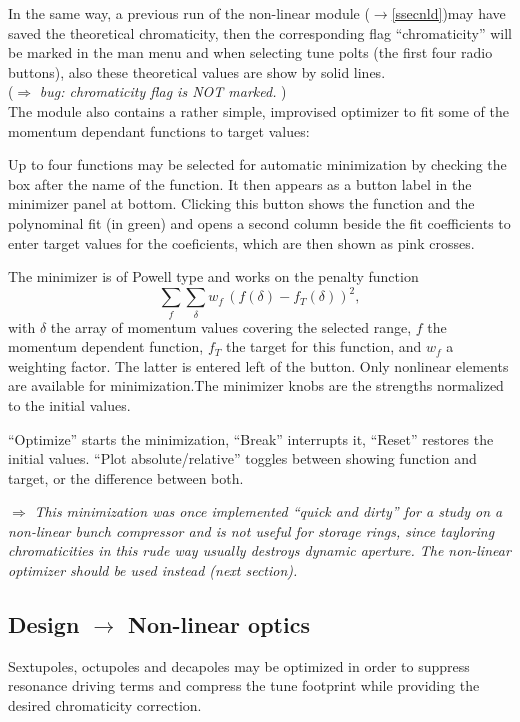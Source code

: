 \documentclass[12pt]{article}
\newcommand{\see}{\mbox{$\rightarrow$}}
\newcommand\todo[1]{$\Longrightarrow$ {\em #1} }
\begin{document}
In the same way, a previous run of the non-linear module (\see\ref{ssecnld})may have saved the theoretical chromaticity, then the corresponding flag ``chromaticity'' will be marked in the man menu  and when selecting tune polts (the first four radio buttons), also these theoretical
values are show by solid lines.\\
(\todo{bug: chromaticity flag is NOT  marked.})\\

The module also contains a rather simple, improvised optimizer to fit some of the momentum dependant functions to target values:

Up to four functions may be selected for automatic minimization by checking the box after the name of the function. It then appears as a button label in the minimizer panel at bottom.
Clicking this button shows the function and the polynominal fit (in green) and opens a second column beside the fit coefficients to enter target values for the coeficients, which are then shown as pink crosses.

The minimizer is of Powell type and works on the penalty function
\[
\sum_f \sum_{\delta} w_f \, (f(\delta)-f_T (\delta))^2,
\]
with $\delta$ the array of momentum values covering the selected range, $f$ the momentum dependent function, $f_T$ the target for this function, and $w_f$ a weighting factor. The latter is entered left of the button. 
Only nonlinear elements are available for minimization.The minimizer knobs are the strengths normalized to the initial values. 

``Optimize'' starts the minimization, ``Break'' interrupts it, ``Reset'' restores the initial values. ``Plot absolute/relative'' toggles between showing function and target, or the difference between both.

\todo{This minimization was once implemented ``quick and dirty'' for a study on a non-linear bunch compressor and is not useful for storage rings, since tayloring chromaticities in this rude way usually destroys dynamic aperture. The non-linear optimizer should be used instead (next section).}


\subsection{\label{ssecnld}Design $\longrightarrow$ Non-linear optics}

Sextupoles, octupoles and decapoles may be optimized in order to suppress resonance driving terms and compress the tune footprint while providing the desired chromaticity correction.
\end{document}
